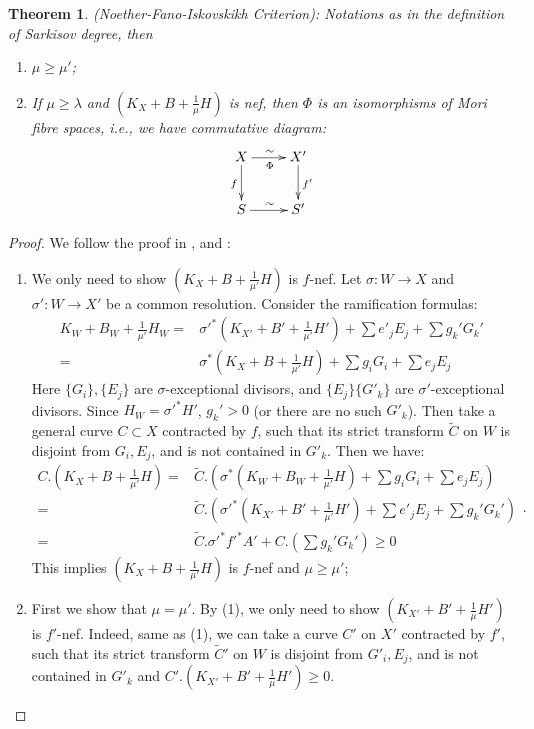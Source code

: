 \documentclass[11pt]{amsart}
\newtheorem{thm}[defn]{Theorem}
\begin{document}
\begin{thm}\label{nfi}
  (Noether-Fano-Iskovskikh Criterion): Notations as in the definition of Sarkisov degree, then 
  \begin{enumerate}
    \item $ \mu\geqslant \mu' $;
    \item If $ \mu \geqslant \lambda $ and $ (K_X+B+\frac{1}{\mu} H) $ is nef, then $\Phi$ is an isomorphisms of Mori fibre spaces, i.e., we have commutative diagram: 
      \[ \xymatrix{
          X\ar[r]^\sim_\Phi\ar[d]_f&X'\ar[d]^{f'}\\
      S\ar[r]^\sim& S' } \]
  \end{enumerate}
\end{thm}

\begin{proof}
  We follow the proof in \cite{haconMinimalModelProgram2012}, \cite{liuSarkisovProgramGeneralized2021} and \cite{cortiFactoringBirationalMaps}:
  \begin{enumerate}
    \item We only need to show $ (K_X+B+\frac{1}{\mu'}H) $ is $ f $-nef.   Let $\sigma:W\to X$ and $\sigma':W\to X'$ be a common resolution. Consider the ramification formulas:
      \[
        \begin{aligned}  
          K_W+B_W+\frac{1}{\mu'}H_W=&\sigma'^*(K_{X'}+B'+\frac{1}{\mu'}H')+\sum e'_jE_j+ \sum g_k'G_k'\\
          =&\sigma^*(K_{X}+B+\frac{1}{\mu'}H)+\sum g_iG_i+\sum e_jE_j
        \end{aligned}
      \]
      Here $ \{G_i\}, \{E_j\} $ are $ \sigma $-exceptional divisors, and $ \{E_j\}\{G'_k\} $ are $ \sigma' $-exceptional divisors. Since $H_W=\sigma'^*H' $, $ g_k'>0 $ (or there are no such $ G'_k $). Then take a general curve $ C\subset X $ contracted by $ f $, such that its strict transform $ \tilde{C} $ on $ W $ is disjoint from $ G_i, E_j $, and is not contained in $ G'_k $. Then we have:
      \[
        \begin{aligned}
          C.\left(K_X+B+\frac{1}{\mu'}H\right)=&\tilde{C}.\left(\sigma^*\left(K_W+B_{W}+\frac{1}{\mu'}H\right)+\sum g_iG_i+\sum e_jE_j\right)\\
          =&\tilde{C}.\left(\sigma'^*\left(K_{X'}+B'+\frac{1}{\mu'}H'\right)+\sum e'_jE_j+ \sum g_k'G_k'\right)\\
          =&\tilde{C}.\sigma'^*f'^*A'+C.\left(\sum g_k'G_k'\right) \geqslant0
        \end{aligned}
      .\]
     This implies $ (K_X+B+\frac{1}{\mu'}H) $ is $ f $-nef and $ \mu\geqslant \mu' $;
   \item  First we show that $ \mu=\mu' $. By (1), we only need to show $ (K_{X'}+B'+\frac{1}{\mu}H') $ is $ f' $-nef. Indeed,  same as (1), we can take a curve $ C' $ on $X'$ contracted by $f'$, such that its strict transform $\tilde{C}'$ on $W$ is disjoint from  $ G'_i, E_j $, and is not contained in $ G'_k $ and 
     $C'.\left(K_{X'}+B'+\frac{1}{\mu}H'\right)\geqslant 0$.


\end{enumerate}
\end{proof}
\end{document}
